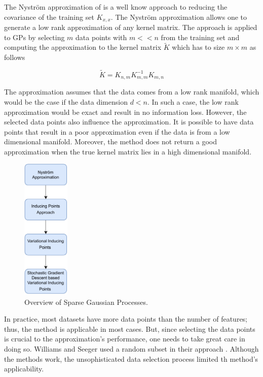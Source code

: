 \documentclass[letterpaper,11pt]{extarticle}
\begin{document}
The Nyström approximation of \cite{WilliamsS01} is a well know approach to reducing the covariance of the training set $K_{x, x}$. The Nyström approximation allows one to generate a low rank approximation of any kernel matrix. The approach is applied to GPs by selecting $m$ data points with $m<<n$  from the training set and computing the approximation to the kernel matrix $\tilde{K}$ which has to size $m \times m$ as follows

$$\tilde{K} = K_{n,m} K_{m,m}^{-1}  K_{m,n}$$

The approximation assumes that the data comes from a low rank manifold, which would be the case if the data dimension $d<n$. In such a case, the low rank approximation would be exact and result in no information loss.  However, the selected data points also influence the approximation. It is possible to have data points that result in a poor approximation even if the data is from a low dimensional manifold. Moreover, the method does not return a good approximation when the true kernel matrix lies in a high dimensional manifold.  

\begin{figure}
  \begin{center}
    \includegraphics[width=0.2\textwidth]{figs/SGP.pdf}
  \end{center}
    \caption{Overview of Sparse Gaussian Processes.}
    \label{fig:sgp}
\end{figure}

In practice, most datasets have more data points than the number of features; thus, the method is applicable in most cases. But, since selecting the data points is crucial to the approximation's performance, one needs to take great care in doing so. Williams and Seeger used a random subset in their approach  \cite{WilliamsS01}. Although the methods work, the unsophisticated data selection process limited th method's applicability. 
\end{document}
